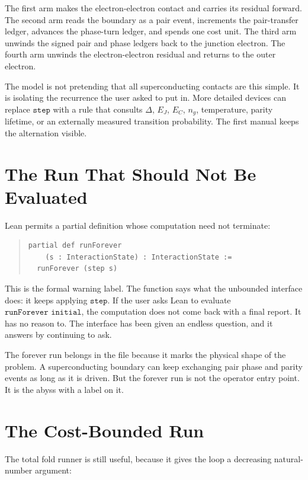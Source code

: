 The first arm makes the electron-electron contact and carries its residual forward. The second arm reads the
boundary as a pair event, increments the pair-transfer ledger, advances the phase-turn ledger, and spends one
cost unit. The third arm unwinds the signed pair and phase ledgers back to the junction electron. The fourth arm
unwinds the electron-electron residual and returns to the outer electron.

The model is not pretending that all superconducting contacts are this simple. It is isolating the recurrence
the user asked to put in. More detailed devices can replace \(\texttt{step}\) with a rule that consults
\(\Delta\), \(E_J\), \(E_C\), \(n_g\), temperature, parity lifetime, or an externally measured transition
probability. The first manual keeps the alternation visible.

\section{The Run That Should Not Be Evaluated}

Lean permits a partial definition whose computation need not terminate:

\begin{quote}\small
\begin{verbatim}
partial def runForever
    (s : InteractionState) : InteractionState :=
  runForever (step s)
\end{verbatim}
\end{quote}

This is the formal warning label. The function says what the unbounded interface does: it keeps applying
\(\texttt{step}\). If the user asks Lean to evaluate \(\texttt{runForever initial}\), the computation does not
come back with a final report. It has no reason to. The interface has been given an endless question, and it
answers by continuing to ask.

The forever run belongs in the file because it marks the physical shape of the problem. A superconducting
boundary can keep exchanging pair phase and parity events as long as it is driven. But the forever run is not the
operator entry point. It is the abyss with a label on it.

\section{The Cost-Bounded Run}

The total fold runner is still useful, because it gives the loop a decreasing natural-number argument:

